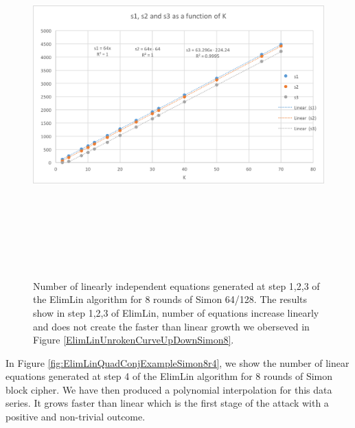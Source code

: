 \begin{figure}[!h] 
	\vspace{-0.2cm}
	\centering
	\includegraphics*[width=160mm, height=14cm]{./pics/s1s2s3asK.png}
	\caption[Number of linearly independent equations generated at step 1,2,3
	of the ElimLin algorithm]{Number of linearly independent equations generated at step 1,2,3
		of the ElimLin algorithm
		for 8 rounds of Simon 64/128. The results show in step 1,2,3 of ElimLin, number of equations increase linearly and does not create the faster than linear growth we oberseved in Figure \ref{ElimLinUnrokenCurveUpDownSimon8}.}
	\label{fig:ElimLinQuadConjExampleSimon8r123}
	\vspace{-0.1cm}
\end{figure}

In Figure \ref{fig:ElimLinQuadConjExampleSimon8r4}, we show the number of linear equations generated at step 4 of the ElimLin algorithm for 8 rounds of Simon block cipher. We have then produced a polynomial interpolation for this data series. It grows faster than linear which is the first stage of the attack with a positive and non-trivial outcome. 

